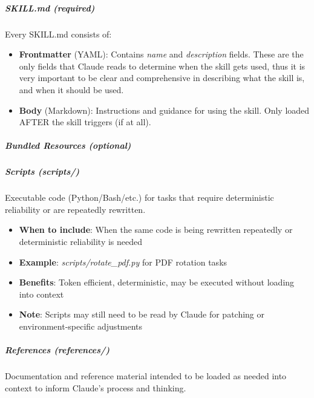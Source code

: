 \documentclass[11pt]{article}
\begin{document}
\subparagraph{SKILL.md (required)}\mbox{}\par

Every SKILL.md consists of:


\begin{itemize}[leftmargin=*,itemsep=2pt,topsep=2pt]
\item {} \textbf{Frontmatter} (YAML): Contains \emph{name} and \emph{description} fields. These are the only fields that Claude reads to determine when the skill gets used, thus it is very important to be clear and comprehensive in describing what the skill is, and when it should be used.
\item {} \textbf{Body} (Markdown): Instructions and guidance for using the skill. Only loaded AFTER the skill triggers (if at all).
\end{itemize}

\subparagraph{Bundled Resources (optional)}\mbox{}\par

\subparagraph{Scripts (\emph{scripts/})}\mbox{}\par

Executable code (Python/Bash/etc.) for tasks that require deterministic reliability or are repeatedly rewritten.


\begin{itemize}[leftmargin=*,itemsep=2pt,topsep=2pt]
\item {} \textbf{When to include}: When the same code is being rewritten repeatedly or deterministic reliability is needed
\item {} \textbf{Example}: \emph{scripts/rotate\_\allowbreak{}pdf.py} for PDF rotation tasks
\item {} \textbf{Benefits}: Token efficient, deterministic, may be executed without loading into context
\item {} \textbf{Note}: Scripts may still need to be read by Claude for patching or environment-specific adjustments
\end{itemize}

\subparagraph{References (\emph{references/})}\mbox{}\par

Documentation and reference material intended to be loaded as needed into context to inform Claude's process and thinking.
\end{document}
